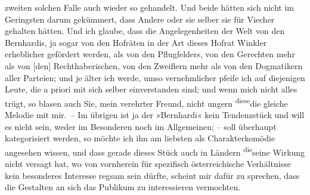                zweiten solchen Falle auch wieder so gehandelt. Und beide hätten sich nicht im
               Geringsten darum gekümmert, dass Andere oder sie selber sie für Viecher gehalten
               hätten. Und ich glaube, dass die \introOben{}Angelegenheiten der\introOben{} Welt
               von den Bernhardis, {\pb}ja sogar von den Hofräten in der Art dieses Hofrat Winkler erheblicher
               gefördert werden, als von den Pflugfelders, von \introOben{}den\introOben{} Gerechten mehr als von
                  {[}den{]} Rechthaberischen, von den Zweiflern mehr als von den
               Dogmatikern aller Parteien\introOben{};\introOben{} und je älter ich werde, umso
               vernehmlicher pfeife ich auf diejenigen Leute, die a
               priori mit sich selber einverstanden sind; und wenn mich nicht alles trügt, so blasen
               auch Sie, mein verehrter Freund, nicht ungern \substVorne{}\textsuperscript{diese}\substDazwischen{}die gleiche\substHinten{} Melodie \introOben{}mit mir\introOben{}. – Im übrigen ist ja der »Bernhardi« kein Tendenzstück und will es nicht
               sein, weder im Besonderen noch im Allgemeinen; – soll überhaupt kategorisiert werden,
               so möchte ich ihn am liebsten als Charakterkomödie angesehen wissen, und dass gerade
               dieses Stück auch in Ländern \substVorne{}\textsuperscript{die}\substDazwischen{}seine\substHinten{} Wirkung nicht versagt hat, wo von vornherein für spezifisch österreichische Verhältnisse kein besonderes
               Interesse regsam sein dürfte, scheint mir dafür zu sprechen, dass die Gestalten an
               sich das Publikum zu interessieren vermochten.\pend
           
